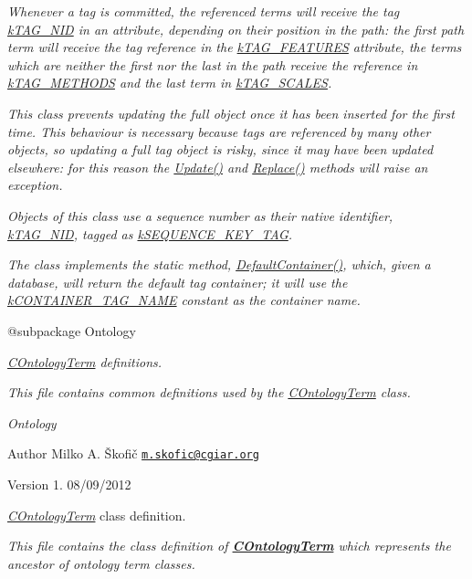 {\itshape Whenever a tag is committed, the referenced terms will receive the tag \hyperlink{}{k\-T\-A\-G\-\_\-\-N\-I\-D} in an attribute, depending on their position in the path\-: the first path term will receive the tag reference in the \hyperlink{}{k\-T\-A\-G\-\_\-\-F\-E\-A\-T\-U\-R\-E\-S} attribute, the terms which are neither the first nor the last in the path receive the reference in \hyperlink{}{k\-T\-A\-G\-\_\-\-M\-E\-T\-H\-O\-D\-S} and the last term in \hyperlink{}{k\-T\-A\-G\-\_\-\-S\-C\-A\-L\-E\-S}.}

{\itshape This class prevents updating the full object once it has been inserted for the first time. This behaviour is necessary because tags are referenced by many other objects, so updating a full tag object is risky, since it may have been updated elsewhere\-: for this reason the \hyperlink{}{Update()} and \hyperlink{}{Replace()} methods will raise an exception.}

{\itshape Objects of this class use a sequence number as their native identifier, \hyperlink{}{k\-T\-A\-G\-\_\-\-N\-I\-D}, tagged as \hyperlink{}{k\-S\-E\-Q\-U\-E\-N\-C\-E\-\_\-\-K\-E\-Y\-\_\-\-T\-A\-G}.}

{\itshape The class implements the static method, \hyperlink{}{Default\-Container()}, which, given a database, will return the default tag container; it will use the \hyperlink{}{k\-C\-O\-N\-T\-A\-I\-N\-E\-R\-\_\-\-T\-A\-G\-\_\-\-N\-A\-M\-E} constant as the container name.}

{\itshape \begin{DoxyVerb} @subpackage        Ontology\end{DoxyVerb}
}

{\itshape \hyperlink{class_c_ontology_term}{C\-Ontology\-Term} definitions.}

{\itshape This file contains common definitions used by the \hyperlink{class_c_ontology_term}{C\-Ontology\-Term} class.}

{\itshape  Ontology}

{\itshape \begin{DoxyAuthor}{Author}
Milko A. Škofič \href{mailto:m.skofic@cgiar.org}{\tt m.\-skofic@cgiar.\-org} 
\end{DoxyAuthor}
\begin{DoxyVersion}{Version}
1. 08/09/2012
\end{DoxyVersion}
{\itshape \hyperlink{class_c_ontology_term}{C\-Ontology\-Term}} class definition.}

{\itshape This file contains the class definition of {\bfseries \hyperlink{class_c_ontology_term}{C\-Ontology\-Term}} which represents the ancestor of ontology term classes.}

